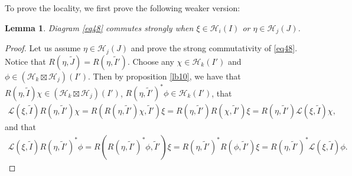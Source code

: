 \documentclass[12pt,a4paper]{article}
\theoremstyle{definition}
\theoremstyle{plain}
\newtheorem{lm}[df]{Lemma}
\newcommand{\mc}{\mathcal}
\newcommand{\wtd}{\widetilde}
\newcommand{\scr}{\mathscr}
\numberwithin{equation}{subsection}
\begin{document}
To prove the locality, we first prove the following weaker version:
\begin{lm}\label{lb17}
	Diagram \eqref{eq48} commutes strongly when $\xi\in\mc H_i(I)$ or $\eta\in\mc H_j(J)$.
\end{lm}

\begin{proof}
	Let us assume $\eta\in\mc H_j(J)$ and prove the strong commutativity of \eqref{eq48}. Notice that $R(\eta,\wtd J)=R(\eta,\wtd I')$. Choose any $\chi\in\mc H_k(I')$ and $\phi\in(\mc H_k\boxtimes\mc H_j)(I')$. Then by proposition \ref{lb10}, we have that $R(\eta,\wtd I)\chi\in(\mc H_k\boxtimes\mc H_j)(I')$, $R(\eta,\wtd I')^*\phi\in\mc H_k(I')$, that
	\begin{align*}
	\scr L(\xi,\wtd I)R(\eta,\wtd I')\chi=R(R(\eta,\wtd I')\chi,\wtd I')\xi=R(\eta,\wtd I')R(\chi,\wtd I')\xi=R(\eta,\wtd I')\scr L(\xi,\wtd I)\chi,
	\end{align*}
	and that
	\begin{align*}
	\scr L(\xi,\wtd I)R(\eta,\wtd I')^*\phi=R(R(\eta,\wtd I')^*\phi,\wtd I')\xi=R(\eta,\wtd I')^*R(\phi,\wtd I')\xi=R(\eta,\wtd I')^*\scr L(\xi,\wtd I)\phi.
	\end{align*}
\end{proof}
\end{document}
